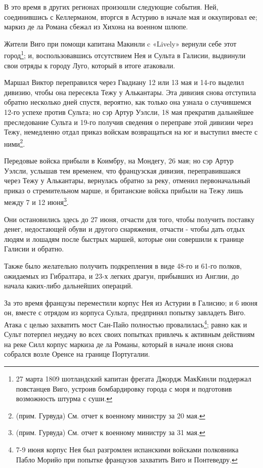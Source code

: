 \documentclass[
  oneside,
  12pt,
  titlepage]{book}
\begin{document}
В это время в других регионах произошли следующие события. Ней, соединившись с Келлерманом, вторгся в Астурию в начале мая и оккупировал ее; маркиз де ла Романа сбежал из Хихона на военном шлюпе.

Жители Виго при помощи капитана Макинли c «Lively» вернули себе этот город\footnote{27 марта 1809 шотландский капитан фрегата Джордж МакКинли поддержал повстанцев Виго, устроив бомбардировку города с моря и подготовив возможность штурма с суши.}; и, воспользовавшись отсутствием Нея и Сульта в Галисии, выдвинули свои отряды к городу Луго, который в итоге атаковали.

Маршал Виктор переправился через Гвадиану 12 или 13 мая и 14-го выделил дивизию, чтобы она пересекла Тежу у Алькантары. Эта дивизия снова отступила обратно несколько дней спустя, вероятно, как только она узнала о случившемся 12-го успехе против Сульта; но сэр Артур Уэлсли, 18 мая прекратив дальнейшее преследование Сульта и 19-го получив сведения о переправе этой дивизии через Тежу, немедленно отдал приказ войскам возвращаться на юг и выступил вместе с ними\footnote{(прим. Гурвуда) См. отчет к военному министру за 20 мая.}.

Передовые войска прибыли в Коимбру, на Мондегу, 26 мая; но сэр Артур Уэлсли, услышав тем временем, что французская дивизия, переправившаяся через Тежу у Алькантары, вернулась обратно за реку, отменил первоначальный приказ о стремительном марше, и британские войска прибыли на Тежу лишь между 7 и 12 июня\footnote{(прим. Гурвуда) См. отчет к военному министру за 31 мая.}.

Они остановились здесь до 27 июня, отчасти для того, чтобы получить поставку денег, недостающей обуви и другого снаряжения, отчасти - чтобы дать отдых людям и лошадям после быстрых маршей, которые они совершили к границе Галисии и обратно.

Также было желательно получить подкрепления в виде 48-го и 61-го полков, ожидаемых из Гибралтара, и 23-х легких драгун, прибывших из Англии, до начала каких-либо дальнейших операций.

За это время французы переместили корпус Нея из Астурии в Галисию; и 6 июня он, вместе с отрядом из корпуса Сульта, предпринял попытку завладеть Виго. Атака с целью захватить мост Сан-Пайо полностью провалилась\footnote{7-9 июня корпус Нея был разгромлен испанскими войсками полковника Пабло Морийо при попытке французов захватить Виго и Понтеведру.}; равно как и Сульт потерпел неудачу во всех своих попытках привлечь к активным действиям на реке Силл корпус маркиза де ла Романы, который в начале июня снова собрался возле Оренсе на границе Португалии.
\end{document}
